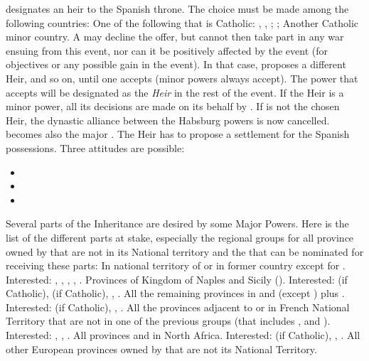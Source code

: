 \phdipl
\aparag \SPA designates an heir to the Spanish throne. The choice must be made
among the following countries:
\bparag One of the following \MAJ that is Catholic: \FRA, \AUS, \ENG;
\bparag \AUSMin;
\bparag Another Catholic minor country.
\aparag A \MAJ may decline the offer, but cannot then take part in any war
ensuing from this event, nor can it be positively affected by the event (for
objectives or any possible gain in the event).
\bparag In that case, \SPA proposes a different Heir, and so on, until one
accepts (minor powers always accept).
\bparag The power that accepts will be designated as the \emph{Heir} in the
rest of the event.
\bparag If the Heir is a minor power, all its decisions are made on its behalf
by \SPA.
\aparag If \AUSaus is not the chosen Heir, the dynastic alliance between the
Habsburg powers is now cancelled.
\bparag \AUSMin becomes also the major \AUS.
\aparag The Heir has to propose a settlement for the Spanish
possessions. Three attitudes are possible:
\begin{itemize}
\item {}
\item {}
\item {}
\end{itemize}
\aparag Several parts of the Inheritance are desired by some Major Powers.
Here is the list of the different parts at stake, especially the regional
groups for all province owned by \SPA that are not in its National territory
and the \MAJ that can be nominated for receiving these parts:
 In national territory of \paysmajeurHollande or
in former country \paysBourgogne except for .
Interested: \FRA, \ENG, \AUS, \HOL, \SPA.
 Provinces of Kingdom of Naples and Sicily (\paysNaples).
Interested: \FRA (if Catholic), \ENG (if Catholic), \AUS, \SPA.
 All the remaining provinces in \regionItalie and
\payssuisse (except \provinceNice) plus \provinceMalta.  Interested: \FRA (if
Catholic), \AUS, \SPA.
 All the provinces adjacent to or in French National
Territory that are not in one of the previous groups (that includes
\provinceNice,  and \provinceRoussillon).  Interested:
\FRA, \AUS, \SPA.
 All provinces and \Presidios in North Africa.
Interested: \FRA (if Catholic), \ENG, \SPA.
 All other European provinces owned by \SPA that are not
its National Territory.
